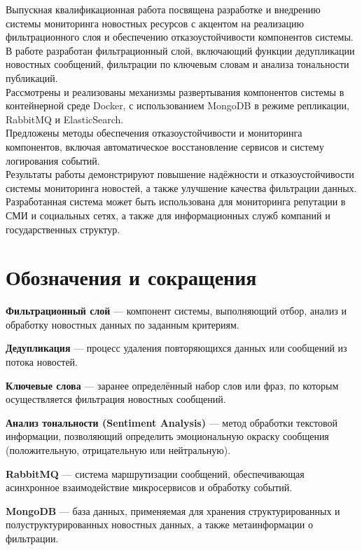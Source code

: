 Выпускная квалификационная работа посвящена разработке и внедрению
системы мониторинга новостных ресурсов с акцентом на реализацию
фильтрационного слоя и обеспечению отказоустойчивости компонентов
системы.\\
В работе разработан фильтрационный слой, включающий функции дедупликации
новостных сообщений, фильтрации по ключевым словам и анализа тональности
публикаций.\\
Рассмотрены и реализованы механизмы развертывания компонентов системы в
контейнерной среде Docker, с использованием MongoDB в режиме репликации,
RabbitMQ и ElasticSearch.\\
Предложены методы обеспечения отказоустойчивости и мониторинга
компонентов, включая автоматическое восстановление сервисов и систему
логирования событий.\\
Результаты работы демонстрируют повышение надёжности и
отказоустойчивости системы мониторинга новостей, а также улучшение
качества фильтрации данных. Разработанная система может быть
использована для мониторинга репутации в СМИ и социальных сетях, а также
для информационных служб компаний и государственных структур.

\hypertarget{ux43eux431ux43eux437ux43dux430ux447ux435ux43dux438ux44f-ux438-ux441ux43eux43aux440ux430ux449ux435ux43dux438ux44f}{%
\section{Обозначения и
сокращения}\label{ux43eux431ux43eux437ux43dux430ux447ux435ux43dux438ux44f-ux438-ux441ux43eux43aux440ux430ux449ux435ux43dux438ux44f}}

\textbf{Фильтрационный слой} --- компонент системы, выполняющий отбор,
анализ и обработку новостных данных по заданным критериям.

\textbf{Дедупликация} --- процесс удаления повторяющихся данных или
сообщений из потока новостей.

\textbf{Ключевые слова} --- заранее определённый набор слов или фраз, по
которым осуществляется фильтрация новостных сообщений.

\textbf{Анализ тональности (Sentiment Analysis)} --- метод обработки
текстовой информации, позволяющий определить эмоциональную окраску
сообщения (положительную, отрицательную или нейтральную).

\textbf{RabbitMQ} --- система маршрутизации сообщений, обеспечивающая
асинхронное взаимодействие микросервисов и обработку событий.

\textbf{MongoDB} --- база данных, применяемая для хранения
структурированных и полуструктурированных новостных данных, а также
метаинформации о фильтрации.

